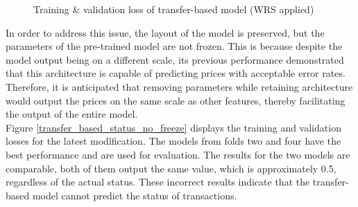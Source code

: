 \documentclass[12pt,twoside]{report}
\begin{document}
\begin{figure}[!htbp]
	\hfil
	\caption{Training \& validation loss of transfer-based model (WRS applied)}
	\label{transfer_based_status_WRS}
\end{figure}

In order to address this issue, the layout of the model is preserved, but the parameters of the pre-trained model are not frozen. This is because despite the model output being on a different scale, its previous performance demonstrated that this architecture is capable of predicting prices with acceptable error rates. Therefore, it is anticipated that removing parameters while retaining architecture would output the prices on the same scale as other features, thereby facilitating the output of the entire model. 
\\

Figure \ref{transfer_based_status_no_freeze} displays the training and validation losses for the latest modlfication. The models from folds two and four have the best performance and are used for evaluation. The results for the two models are comparable, both of them output the same value, which is approximately 0.5, regardless of the actual status. These incorrect results indicate that the transfer-based model cannot predict the status of transactions.  
\end{document}
